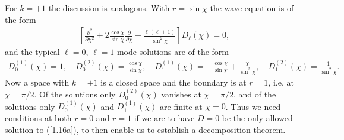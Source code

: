 \documentclass[aps,onecolumn,10pt]{revtex4}
\numberwithin{equation}{section}
\numberwithin{equation}{section}
\begin{document}
For $k=+1$ the discussion is analogous. With $r=\sin\chi$ the wave equation is of the form
%
\begin{align}
\left[\frac{\partial^2}{\partial \chi^2}+2\frac{\cos\chi}{\sin\chi}\frac{\partial}{\partial \chi}-\frac{\ell(\ell+1)}{\sin^2\chi}\right]D_{\ell}(\chi)=0,
\label{1.19a}
\end{align}
%
and the typical $\ell=0$, $\ell=1$ mode solutions are of the form
%
\begin{align}
D^{(1)}_{0}(\chi)=1,\quad D^{(2)}_{0}(\chi)=\frac{\cos\chi}{\sin\chi},\quad D^{(1)}_{1}(\chi)=-\frac{\cos\chi}{\sin\chi}+\frac{\chi}{\sin^2\chi},\quad D^{(2)}_{1}(\chi)=\frac{1}{\sin^2\chi}.
\label{1.20a}
\end{align}
% 
Now a space with $k=+1$ is a closed space and the boundary is at $r=1$, i.e. at $\chi=\pi/2$. Of the solutions only $D^{(2)}_{0}(\chi)$ vanishes at $\chi=\pi/2$, and of the solutions only $D^{(1)}_{0}(\chi)$ and $D^{(1)}_{1}(\chi)$ are finite at $\chi=0$. Thus  we need conditions at both $r=0$ and $r=1$ if we are to have $D=0$ be the only allowed solution to (\ref{1.16a}), to then enable us to establish a decomposition theorem.
\end{document}
